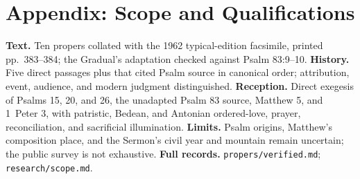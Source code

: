 \section*{Appendix: Scope and Qualifications}

\begin{studyframe}
\textbf{Text.} Ten propers collated with the 1962 typical-edition facsimile, printed pp.~383--384; the Gradual's adaptation checked against Psalm 83:9--10. \textbf{History.} Five direct passages plus that cited Psalm source in canonical order; attribution, event, audience, and modern judgment distinguished. \textbf{Reception.} Direct exegesis of Psalms 15, 20, and 26, the unadapted Psalm 83 source, Matthew 5, and 1~Peter 3, with patristic, Bedean, and Antonian ordered-love, prayer, reconciliation, and sacrificial illumination. \textbf{Limits.} Psalm origins, Matthew's composition place, and the Sermon's civil year and mountain remain uncertain; the public survey is not exhaustive. \textbf{Full records.} \nolinkurl{propers/verified.md}; \nolinkurl{research/scope.md}.
\end{studyframe}

